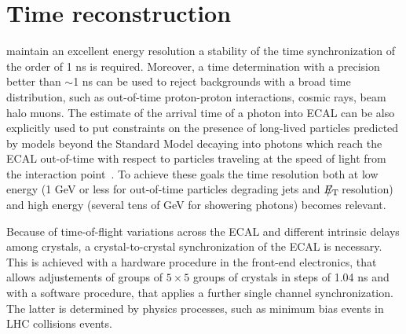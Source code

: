 \documentclass[journal]{IEEEtran}
\newcommand{\ETslash}{\ensuremath{E_{\mathrm{T}}\hspace{-1.1em}/\kern0.45em}}
\begin{document}
\section{Time reconstruction}
\label{sec:timereco}
 maintain an excellent energy resolution a stability of the time synchronization of the order of 1 ns is required. Moreover, a time determination with a precision better than $\sim$1 ns can be used to reject backgrounds with a broad time distribution, such as out-of-time proton-proton interactions, cosmic rays, beam halo muons. The estimate of the arrival time of a photon into ECAL can be also explicitly used to put constraints on the presence of long-lived particles predicted by models beyond the Standard Model decaying into photons which reach the ECAL out-of-time with respect to particles traveling at the speed of light from the interaction point~\cite{Chatrchyan:2012ir}. To achieve these goals the time resolution both at low energy (1 GeV or less for out-of-time particles degrading jets and $\ETslash$ resolution) and high energy (several tens of GeV for showering photons) becomes relevant.

Because of time-of-flight variations across the ECAL and different intrinsic delays among crystals, a crystal-to-crystal synchronization of the ECAL is necessary. This is achieved with a hardware procedure in the front-end electronics, that allows adjustements of groups of $5 \times 5$ groups of crystals in steps of 1.04 ns and with a software procedure, that applies a further single channel synchronization. The latter is determined by physics processes, such as minimum bias events in LHC collisions events.
\end{document}
